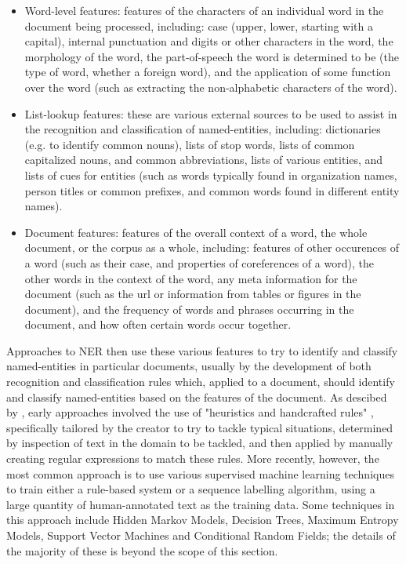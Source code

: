 \documentclass[12pt, a4paper]{report}
\begin{document}
\begin{itemize}
	\item {Word-level features: features of the characters of an individual word in the document being processed, including: case (upper, lower, starting with a capital), internal punctuation and digits or other characters in the word, the morphology of the word, the part-of-speech the word is determined to be (the type of word, whether a foreign word), and the application of some function over the word (such as extracting the non-alphabetic characters of the word).}
	\item {List-lookup features: these are various external sources to be used to assist in the recognition and classification of named-entities, including: dictionaries (e.g. to identify common nouns), lists of stop words, lists of common capitalized nouns, and common abbreviations, lists of various entities, and lists of cues for entities (such as words typically found in organization names, person titles or common prefixes, and common words found in different entity names).}
	\item {Document features: features of the overall context of a word, the whole document, or the corpus as a whole, including: features of other occurences of a word (such as their case, and properties of coreferences of a word), the other words in the context of the word, any meta information for the document (such as the url or information from tables or figures in the document), and the frequency of words and phrases occurring in the document, and how often certain words occur together.}
\end{itemize}

Approaches to NER then use these various features to try to identify and classify named-entities in particular documents, usually by the  development of both recognition and classification rules which, applied to a document, should identify and classify named-entities based on the features of the document. As descibed by \citet{nadeau2009}, early approaches involved the use of "heuristics and handcrafted rules" \citet[p.~2]{nadeau2009}, specifically tailored by the creator to try to tackle typical situations, determined by inspection of text in the domain to be tackled, and then applied by manually creating regular expressions to match these rules. More recently, however, the most common approach is to use various supervised machine learning techniques to train either a rule-based system or a sequence labelling algorithm, using a large quantity of human-annotated text as the training data. Some techniques in this approach include Hidden Markov Models, Decision Trees, Maximum Entropy Models, Support Vector Machines and Conditional Random Fields; the details of the majority of these is beyond the scope of this section.
\end{document}
